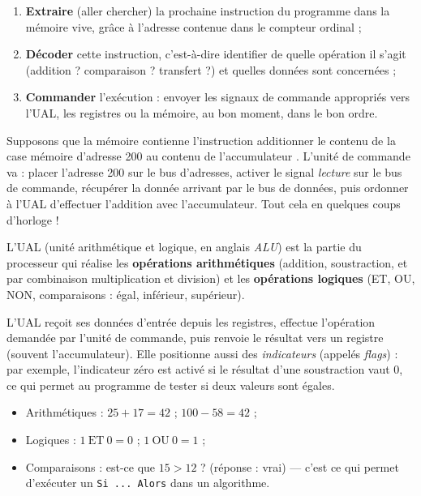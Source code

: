 \documentclass[11pt]{article}
\newcommand{\cle}[1]{{\popxbold\color{popdark}#1}}
\newcounter{popsec}
\newcounter{popsub}
\newcommand{\courssub}[1]{%
  \stepcounter{popsub}%
  \par\vspace{9pt}\noindent{\popxbold\fontsize{11.5}{13}\selectfont\color{popink}{\color{poporange}\thepopsec.\thepopsub}\hspace{6pt}#1}\par\nopagebreak\vspace{4pt}
}
\begin{document}
\begin{enumerate}
  \item \textbf{Extraire} (aller chercher) la prochaine instruction du programme dans la mémoire vive, grâce à l'adresse contenue dans le compteur ordinal ;
  \item \textbf{Décoder} cette instruction, c'est-à-dire identifier de quelle opération il s'agit (addition ? comparaison ? transfert ?) et quelles données sont concernées ;
  \item \textbf{Commander} l'exécution : envoyer les signaux de commande appropriés vers l'UAL, les registres ou la mémoire, au bon moment, dans le bon ordre.
\end{enumerate}

\begin{exemplebox}[L'UC au travail]
Supposons que la mémoire contienne l'instruction \og additionner le contenu de la case mémoire d'adresse 200 au contenu de l'accumulateur \fg. L'unité de commande va : placer l'adresse 200 sur le bus d'adresses, activer le signal \emph{lecture} sur le bus de commande, récupérer la donnée arrivant par le bus de données, puis ordonner à l'UAL d'effectuer l'addition avec l'accumulateur. Tout cela en quelques coups d'horloge !
\end{exemplebox}

\courssub{L'UAL : la calculatrice du processeur}

\begin{definition}
L'\cle{UAL} (unité arithmétique et logique, en anglais \emph{ALU}) est la partie du processeur qui réalise les \textbf{opérations arithmétiques} (addition, soustraction, et par combinaison multiplication et division) et les \textbf{opérations logiques} (ET, OU, NON, comparaisons : égal, inférieur, supérieur).
\end{definition}

L'UAL reçoit ses données d'entrée depuis les registres, effectue l'opération demandée par l'unité de commande, puis renvoie le résultat vers un registre (souvent l'accumulateur). Elle positionne aussi des \emph{indicateurs} (appelés \emph{flags}) : par exemple, l'indicateur \og zéro \fg{} est activé si le résultat d'une soustraction vaut $0$, ce qui permet au programme de tester si deux valeurs sont égales.

\begin{exemplebox}
\begin{itemize}
  \item Arithmétiques : $25 + 17 = 42$ ; $100 - 58 = 42$ ;
  \item Logiques : $1\ \text{ET}\ 0 = 0$ ; $1\ \text{OU}\ 0 = 1$ ;
  \item Comparaisons : est-ce que $15 > 12$ ? (réponse : vrai) — c'est ce qui permet d'exécuter un \texttt{Si ... Alors} dans un algorithme.
\end{itemize}
\end{exemplebox}
\end{document}
